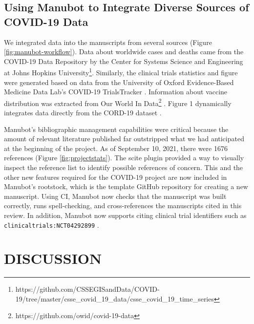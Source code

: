 \documentclass[twocolumn]{ceurart}
\begin{document}
\hypertarget{using-manubot-to-integrate-diverse-sources-of-covid-19-data}{%
\subsection{Using Manubot to Integrate Diverse Sources of COVID-19 Data}\label{using-manubot-to-integrate-diverse-sources-of-covid-19-data}}

We integrated data into the manuscripts from several sources (Figure \ref{fig:manubot-workflow}).
Data about worldwide cases and deaths came from the COVID-19 Data Repository by the Center for Systems Science and Engineering at Johns Hopkins University\footnote{https://github.com/CSSEGISandData/COVID-19/tree/master/csse\_covid\_19\_data/csse\_covid\_19\_time\_series}.
Similarly, the clinical trials statistics and figure were generated based on data from the University of Oxford Evidence-Based Medicine Data Lab's COVID-19 TrialsTracker \citep{SSbnPnzT}.
Information about vaccine distribution was extracted from Our World In Data\footnote{https://github.com/owid/covid-19-data} \citep{ZHvhFakW}.
Figure 1 dynamically integrates data directly from the CORD-19 dataset \citep{CiOwklc6}.

Manubot's bibliographic management capabilities were critical because the amount of relevant literature published far outstripped what we had anticipated at the beginning of the project.
As of September 10, 2021, there were 1676 references (Figure \ref{fig:projectstats}).
The scite plugin provided a way to visually inspect the reference list to identify possible references of concern.
This and the other new features required for the COVID-19 project are now included in Manubot's rootstock, which is the template GitHub repository for creating a new manuscript.
Using CI, Manubot now checks that the manuscript was built correctly, runs spell-checking, and cross-references the manuscripts cited in this review.
In addition, Manubot now supports citing clinical trial identifiers such as \texttt{clinicaltrials:NCT04292899} \citep{yTCAmOyt}.

\hypertarget{discussion}{%
\section{DISCUSSION}\label{discussion}}
\end{document}
